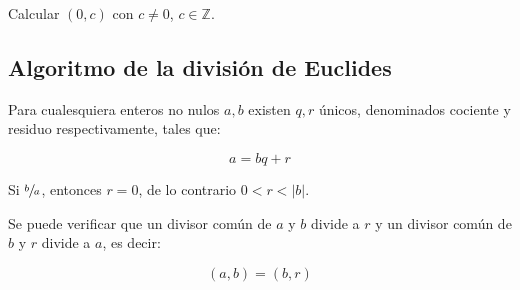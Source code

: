         \begin{ejemplo}
        \end{ejemplo}

        \begin{ejemplo}
        \end{ejemplo}

        \begin{ejercicio}
            Calcular $(0, c)$ con $c \ne 0$, $c \in \mathbb{Z}$.
        \end{ejercicio}


    \subsection{Algoritmo de la división de Euclides}

        \begin{definicion}
            Para cualesquiera enteros no nulos $a, b$ existen $q, r$ únicos, denominados cociente y residuo respectivamente, tales que:

            \begin{equation}
                a = b q + r
            \end{equation}

            Si $\sfrac{b}{a}$, entonces $r = 0$, de lo contrario $0 < r < |b|$.
        \end{definicion}

        \begin{proposicion}
            Se puede verificar que un divisor común de $a$ y $b$ divide a $r$ y un divisor común de $b$ y $r$ divide a $a$, es decir:

            \begin{equation}
                (a, b) = (b, r)
            \end{equation}
        \end{proposicion}

